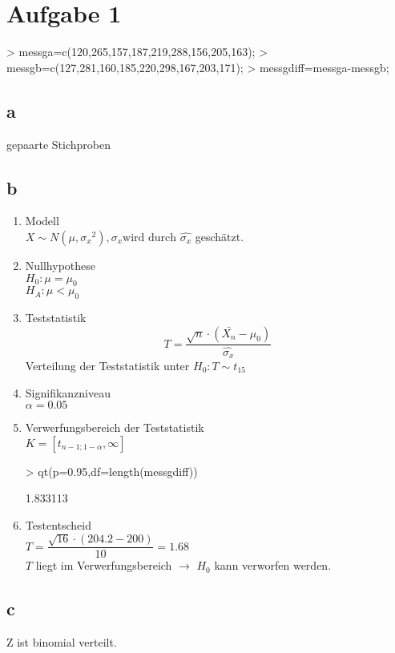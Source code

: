 

\section{Aufgabe 1}
\begin{Schunk}
\begin{Sinput}
> messga=c(120,265,157,187,219,288,156,205,163);
> messgb=c(127,281,160,185,220,298,167,203,171);
> messgdiff=messga-messgb;
\end{Sinput}
\end{Schunk}

\subsection{a}
gepaarte Stichproben

\subsection{b}
\begin{enumerate}
  \item Modell \\
        $ X \sim N(\mu, {\sigma_x}^2), \sigma_x 
        \text{wird durch $\hat{\sigma_x}$}$ geschätzt. 
  \item Nullhypothese \\
        $ H_0: \mu = \mu_0 $ \\
        $ H_A: \mu < \mu_0 $
  \item Teststatistik \\
        \[ T = \frac{\sqrt{n}\cdot (\bar{X_n} - \mu_0)}{\hat{\sigma_x}} \] 
        Verteilung der Teststatistik unter $ H_0: T \sim t_{15} $
  \item Signifikanzniveau \\
        $ \alpha = 0.05 $
  \item Verwerfungsbereich der Teststatistik \\
        $ K = [t_{n-1;1-\alpha}, \infty] $
\begin{Schunk}
\begin{Sinput}
>         qt(p=0.95,df=length(messgdiff))
\end{Sinput}
\begin{Soutput}
[1] 1.833113
\end{Soutput}
\end{Schunk}
  \item Testentscheid \\
        $ T = \dfrac{\sqrt{16} \cdot (204.2 - 200)}{10} = 1.68 $ \\
        $T$ liegt im Verwerfungsbereich $\rightarrow$ $H_0$ kann verworfen 
        werden. 
\end{enumerate}

\subsection{c}
Z ist binomial verteilt. 
